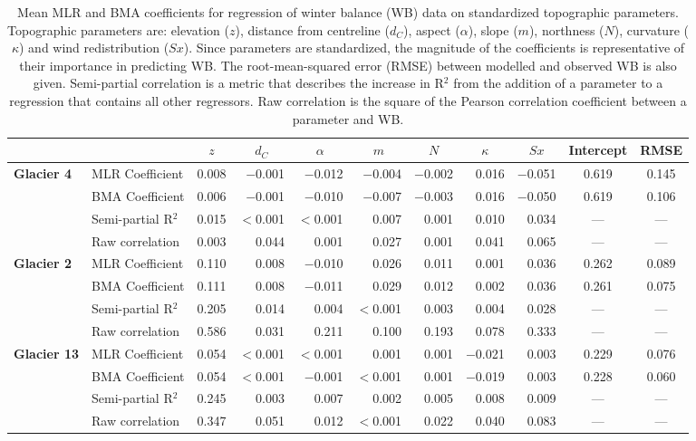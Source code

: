 \documentclass{sfuthesis}
\newcommand{\params}{Topographic parameters are: elevation ($z$), distance from centreline ($d_C$), aspect ($\alpha$), slope ($m$), northness ($N$), curvature ($\kappa$) and wind redistribution ($Sx$). }
\begin{document}
{\begin{table}
\centering
\caption[Mean MLR and BMA coefficients for regression of winter balance (WB) data on standardized topographic parameters]{Mean MLR and BMA coefficients for regression of winter balance (WB) data on standardized topographic parameters. \params  Since parameters are standardized, the magnitude of the coefficients is representative of their importance in predicting WB. The root-mean-squared error (RMSE) between modelled and observed WB is also given. Semi-partial correlation is a metric that describes the increase in R$^2$ from the addition of a parameter to a regression that contains all other regressors. Raw correlation is the square of the Pearson correlation coefficient between a parameter and WB.}
\label{tab:MLRmeancoeff}
\begin{tabular}{ll|rrrrrrrc|c}
 &  & \multicolumn{1}{c}{$z$} & \multicolumn{1}{c}{$d_C$} & \multicolumn{1}{c}{$\alpha$} & \multicolumn{1}{c}{$m$} & \multicolumn{1}{c}{$N$} & \multicolumn{1}{c}{$\kappa$} & \multicolumn{1}{c}{$Sx$} & Intercept & RMSE \\ \hline \hline
\multirow{4}{*}{\textbf{Glacier 4}} & MLR Coefficient & 0.008 & $-$0.001 & $-$0.012 & $-$0.004 & $-$0.002 & 0.016 & $-$0.051 & 0.619 & 0.145 \\
 & BMA Coefficient & 0.006 & $-$0.001 & $-$0.010 & $-$0.007 & $-$0.003 & 0.016 & $-$0.050 & 0.619 & 0.106 \\
 & Semi-partial R$^2$ & 0.015 & $<$0.001 & $<$0.001 & 0.007 & 0.001 & 0.010 & 0.034 & --- & --- \\
 & Raw correlation & 0.003 & 0.044 & 0.001 & 0.027 & 0.001 & 0.041 & 0.065 & --- & --- \\ \hline
\multirow{4}{*}{\textbf{Glacier 2}} & MLR Coefficient & 0.110 & 0.008 & $-$0.010 & 0.026 & 0.011 & 0.001 & 0.036 & 0.262 & 0.089 \\
 & BMA Coefficient & 0.111 & 0.008 & $-$0.011 & 0.029 & 0.012 & 0.002 & 0.036 & 0.261 & 0.075 \\
 & Semi-partial R$^2$ & 0.205 & 0.014 & 0.004 & $<$0.001 & 0.003 & 0.004 & 0.028 & --- & --- \\
 & Raw correlation & 0.586 & 0.031 & 0.211 & 0.100 & 0.193 & 0.078 & 0.333 & --- & --- \\ \hline
\multirow{4}{*}{\textbf{Glacier 13}} & MLR Coefficient & 0.054 & $<$0.001 & $<$0.001 & 0.001 & 0.001 & $-$0.021 & 0.003 & 0.229 & 0.076 \\
 & BMA Coefficient & 0.054 & $<$0.001 & $-$0.001 & $<$0.001 & 0.001 & $-$0.019 & 0.003 & 0.228 & 0.060 \\
 & Semi-partial R$^2$ & 0.245 & 0.003 & 0.007 & 0.002 & 0.005 & 0.008 & 0.009 & --- & --- \\
 & Raw correlation & 0.347 & 0.051 & 0.012 & $<$0.001 & 0.022 & 0.040 & 0.083 & --- & ---
\end{tabular}
\end{table}

}
\end{document}
